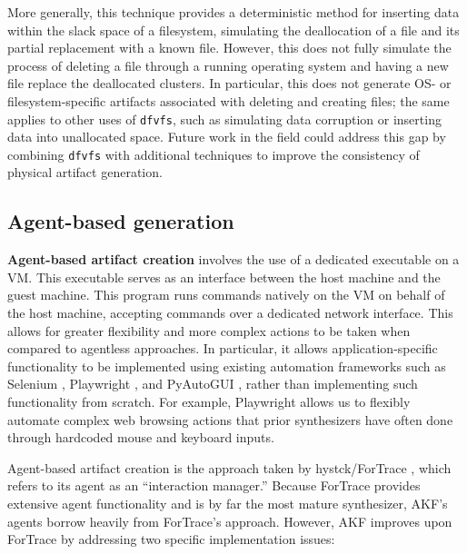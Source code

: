 \documentclass[final,5p,times,twocolumn]{elsarticle}
\newcommand{\passthrough}[1]{#1}
\begin{document}
More generally, this technique provides a deterministic method for
inserting data within the slack space of a filesystem, simulating the
deallocation of a file and its partial replacement with a known file.
However, this does not fully simulate the process of deleting a file
through a running operating system and having a new file replace the
deallocated clusters. In particular, this does not generate OS- or
filesystem-specific artifacts associated with deleting and creating
files; the same applies to other uses of
\passthrough{\lstinline!dfvfs!}, such as simulating data corruption or
inserting data into unallocated space. Future work in the field could
address this gap by combining \passthrough{\lstinline!dfvfs!} with
additional techniques to improve the consistency of physical artifact
generation.

\subsection{Agent-based generation}\label{agent-based-generation}

\textbf{Agent-based artifact creation} involves the use of a dedicated
executable on a VM. This executable serves as an interface between the
host machine and the guest machine. This program runs commands natively
on the VM on behalf of the host machine, accepting commands over a
dedicated network interface. This allows for greater flexibility and
more complex actions to be taken when compared to agentless approaches.
In particular, it allows application-specific functionality to be
implemented using existing automation frameworks such as Selenium
\citep{SeleniumHQSelenium2025}, Playwright
\citep{MicrosoftPlaywrightpython2025}, and PyAutoGUI
\citep{sweigartAsweigartPyautogui2025}, rather than implementing such
functionality from scratch. For example, Playwright allows us to
flexibly automate complex web browsing actions that prior synthesizers
have often done through hardcoded mouse and keyboard inputs.

Agent-based artifact creation is the approach taken by hystck/ForTrace
\citep{gobelNovelApproachGenerating2020,gobelForTraceHolisticForensic2022},
which refers to its agent as an ``interaction manager.'' Because
ForTrace provides extensive agent functionality and is by far the most
mature synthesizer, AKF's agents borrow heavily from ForTrace's
approach. However, AKF improves upon ForTrace by addressing two specific
implementation issues:
\end{document}
